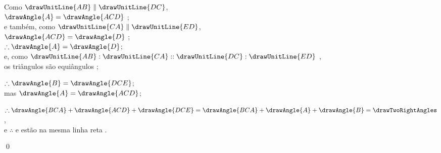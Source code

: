 \documentclass[booklanguage=brazilian]{byrnebook}
\begin{document}
\begin{center}
Como $\drawUnitLine{AB} \parallel \drawUnitLine{DC}$,\\
$\drawAngle{A} = \drawAngle{ACD}$ ;\\
e também, como $\drawUnitLine{CA} \parallel \drawUnitLine{ED}$,\\
$\drawAngle{ACD} = \drawAngle{D}$ ;\\
$\therefore \drawAngle{A} = \drawAngle{D}$;\\
e, como $\drawUnitLine{AB} : \drawUnitLine{CA} :: \drawUnitLine{DC} : \drawUnitLine{ED}$ \byref{\hypref},\\
os triângulos são equiângulos ;

$\therefore \drawAngle{B} = \drawAngle{DCE}$;\\
mas $\drawAngle{A} = \drawAngle{ACD}$;

$\therefore \drawAngle{BCA} + \drawAngle{ACD} + \drawAngle{DCE} = \drawAngle{BCA} + \drawAngle{A} + \drawAngle{B} = \drawTwoRightAngles$ ,\\
e $\therefore$  e  estão na mesma linha reta .
\end{center}

\qed
\end{document}
